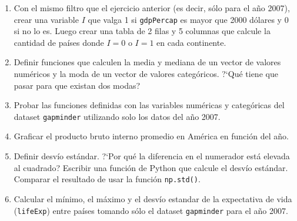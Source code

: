 \documentclass[a4paper,11pt]{article}
\theoremstyle{definition}
\begin{document}
\begin{enumerate}[resume]
\begin{enumerate}[resume]
\item Con el mismo filtro que el ejercicio anterior (es decir, s\'olo para el a\~no 2007), crear una variable $I$
 que valga 1 si \lstinline{gdpPercap} es mayor que 2000 d\'olares y 0 si no lo es. Luego crear una tabla de 2 filas y 5 columnas que calcule la cantidad de pa\'ises donde $I = 0$ o $I = 1$
 en cada continente. 


\item Definir funciones que calculen la media y mediana de un vector de valores numéricos y la moda de un vector de valores categóricos. ?`Qu\'e tiene que pasar para que existan dos modas?

\item Probar las funciones definidas con las variables numéricas y categóricas del dataset \lstinline{gapminder} utilizando solo los datos del año 2007.

\item Graficar el producto bruto interno promedio en América en función del año.

\item Definir desv\'io est\'andar. ?`Por qu\'e la diferencia en el numerador est\'a elevada al cuadrado? Escribir una funci\'on de Python que calcule el desv\'io est\'andar. Comparar el resultado de usar la funci\'on \lstinline{np.std()}.

\item Calcular el mínimo, el máximo y el desv\'io estandar de la expectativa de vida (\lstinline{lifeExp}) entre pa\'ises tomando s\'olo el dataset \lstinline{gapminder} para el a\~no 2007.
\end{enumerate}


\end{enumerate}
\end{document}
